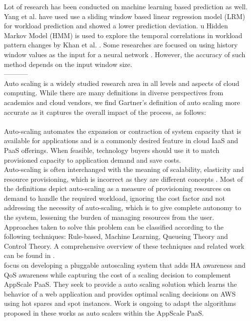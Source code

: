 Lot of research has been conducted on machine learning based prediction as well. Yang et al. \cite{Yang_2013} have used use a sliding window based linear regression model (LRM) for workload prediction and showed a lower prediction deviation. u Hidden Markov Model (HMM) is used to explore the temporal correlations in workload pattern changes by Khan et al. \cite{Khan_2012}. Some  researches are focused on using history window values as the input for a neural network \cite{Islam_2012}. However, the accuracy of such method depends on the input window size.\\
-----------\\
Auto scaling is a widely studied research area in all levels and aspects of cloud computing. While there are many definitions in diverse perspectives from academics and cloud vendors, we find Gartner’s definition of auto scaling more accurate as it captures the overall impact of the process, as follows:\\\\

Auto-scaling automates the expansion or contraction of system capacity that is available for applications and is a commonly desired feature in cloud IaaS and PaaS offerings. When feasible, technology buyers should use it to match provisioned capacity to application demand and save costs.\cite{website:gartner}\\

Auto-scaling is often interchanged with the meaning of scalability, elasticity and resource provisioning, which is incorrect as they are different concepts \cite{autoscalingissues}. Most of the definitions depict auto-scaling as a measure of provisioning resources on demand to handle the required workload, ignoring the cost factor and not addressing the necessity of auto-scaling, which is to give complete autonomy to the system, lessening the burden  of managing resources from the user. Approaches taken to solve this problem can be classified according to the following techniques: Rule-based, Machine Learning, Queueing Theory and Control Theory. A comprehensive overview of these techniques and related work can be found in \cite{reviewofautoscaling}.\\

\cite{pluggable} focus on developing a pluggable autoscaling system that adds HA awareness and QoS awareness while capturing the cost of a scaling decision to complement AppScale PaaS. They seek to provide a auto scaling solution which learns the behavior of a web application and provides optimal scaling decisions on AWS using hot spares and spot instances. Work is ongoing to adapt the algorithms proposed in these works as auto scalers within the AppScale PaaS.\\

